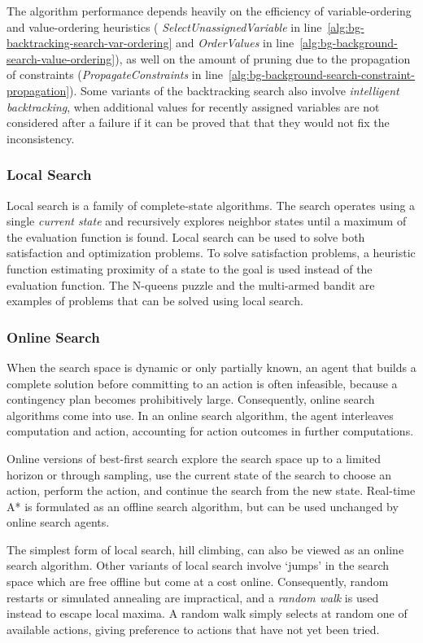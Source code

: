The algorithm performance depends heavily on the efficiency of
variable-ordering and value-ordering heuristics ({\em
  SelectUnassignedVariable} in
line~\ref{alg:bg-backtracking-search-var-ordering}
and {\em  OrderValues} in
line~\ref{alg:bg-background-search-value-ordering}), as well on the
amount of pruning due to the propagation of constraints
({\em PropagateConstraints} in line~\ref{alg:bg-background-search-constraint-propagation}). Some
variants of the backtracking search also involve {\em intelligent
  backtracking}, when additional values for recently assigned
variables are not considered after a failure if it can be proved
that that they would not fix the inconsistency.

\subsubsection{Local Search}

Local search is a family of complete-state algorithms. The search
operates using a single {\em current state} and recursively explores
neighbor states until a maximum of the evaluation function is
found. Local search can be used to solve both satisfaction and
optimization problems. To solve satisfaction problems, a heuristic
function estimating proximity of a state to the goal is used instead
of the evaluation function. The N-queens puzzle and the multi-armed
bandit are examples of problems that can be solved using local search.

\subsubsection{Online Search}

When the search space is dynamic or only partially known, an agent
that builds a complete solution before committing to an action is
often infeasible, because a contingency plan becomes prohibitively
large. Consequently, online search algorithms come into use. In an
online search algorithm, the agent interleaves computation and action,
accounting for action outcomes in further computations.

Online versions of best-first search explore the search space up to a
limited horizon or through sampling, use the current state
of the search to choose an action, perform the action, and continue
the search from the new state. Real-time A* is formulated as an offline
search algorithm, but can be used unchanged by online search agents.

The simplest form of local search, hill climbing, can also be
viewed as an online search algorithm. Other variants of local search
involve `jumps' in the search space which are free offline but come at
a cost online. Consequently, random restarts or simulated annealing
are impractical, and a {\em random walk} is used instead to escape
local maxima. A random walk simply selects at random one of available
actions, giving preference to actions that have not yet been tried.

